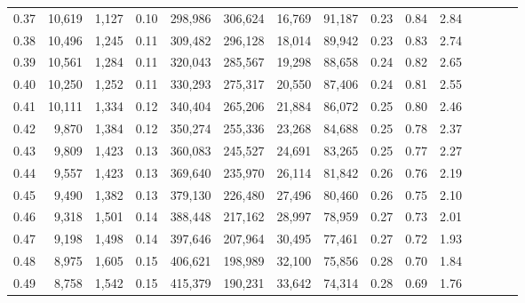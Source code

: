 \begin{tabular}{rrrcrrrrrrrrrrr}
0.37 &  10,619 &  1,127 &                                       0.10 &  298,986 &  306,624 &   16,769 &   91,187 &  0.23 &  0.84 &                         2.84 \\
0.38 &  10,496 &  1,245 &                                       0.11 &  309,482 &  296,128 &   18,014 &   89,942 &  0.23 &  0.83 &                         2.74 \\
0.39 &  10,561 &  1,284 &                                       0.11 &  320,043 &  285,567 &   19,298 &   88,658 &  0.24 &  0.82 &                         2.65 \\
0.40 &  10,250 &  1,252 &                                       0.11 &  330,293 &  275,317 &   20,550 &   87,406 &  0.24 &  0.81 &                         2.55 \\
0.41 &  10,111 &  1,334 &                                       0.12 &  340,404 &  265,206 &   21,884 &   86,072 &  0.25 &  0.80 &                         2.46 \\
0.42 &   9,870 &  1,384 &                                       0.12 &  350,274 &  255,336 &   23,268 &   84,688 &  0.25 &  0.78 &                         2.37 \\
0.43 &   9,809 &  1,423 &                                       0.13 &  360,083 &  245,527 &   24,691 &   83,265 &  0.25 &  0.77 &                         2.27 \\
0.44 &   9,557 &  1,423 &                                       0.13 &  369,640 &  235,970 &   26,114 &   81,842 &  0.26 &  0.76 &                         2.19 \\
0.45 &   9,490 &  1,382 &                                       0.13 &  379,130 &  226,480 &   27,496 &   80,460 &  0.26 &  0.75 &                         2.10 \\
0.46 &   9,318 &  1,501 &                                       0.14 &  388,448 &  217,162 &   28,997 &   78,959 &  0.27 &  0.73 &                         2.01 \\
0.47 &   9,198 &  1,498 &                                       0.14 &  397,646 &  207,964 &   30,495 &   77,461 &  0.27 &  0.72 &                         1.93 \\
0.48 &   8,975 &  1,605 &                                       0.15 &  406,621 &  198,989 &   32,100 &   75,856 &  0.28 &  0.70 &                         1.84 \\
0.49 &   8,758 &  1,542 &                                       0.15 &  415,379 &  190,231 &   33,642 &   74,314 &  0.28 &  0.69 &                         1.76 \\

\end{tabular}
